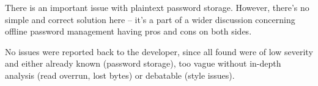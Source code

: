 \documentclass[11pt]{article}
\begin{document}
There is an important issue with plaintext password storage. However, there's no simple and correct solution here -- it's a part of a wider discussion concerning offline password management having pros and cons on both sides.

No issues were reported back to the developer, since all found were of low severity and either already known (password storage), too vague without in-depth analysis (read overrun, lost bytes) or debatable (style issues).
\end{document}

